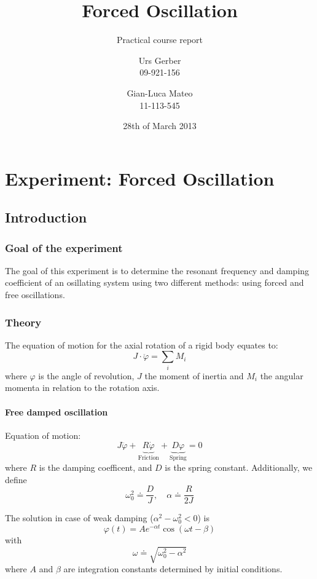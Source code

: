 \documentclass{scrreprt}
\author{Urs Gerber\\09-921-156 \and Gian-Luca Mateo\\11-113-545}
\date{28th of March 2013}
\title{Forced Oscillation}
\subtitle{Practical course report}
\renewcommand{\phi}{\varphi}
\begin{document}
\maketitle

\tableofcontents
\newpage

\chapter{Experiment: Forced Oscillation}
\section{Introduction}
\subsection{Goal of the experiment}
The goal of this experiment is to determine the resonant frequency and damping coefficient of an osillating system using two different methods: using forced and free oscillations.

\subsection{Theory}
The equation of motion for the axial rotation of a rigid body equates to:
\begin{equation}
J\cdot \ddot{\phi} = \sum_i M_i
\end{equation}
where $\phi$ is the angle of revolution, $J$ the moment of inertia and $M_i$ the angular momenta in relation to the rotation axis.

\subsubsection{Free damped oscillation}
Equation of motion:
\begin{equation}
J\ddot{\phi} + \underbrace{R \dot{\phi}}_{\text{Friction}} + \underbrace{D \phi}_{\text{Spring}} = 0
\end{equation}
where $R$ is the damping coefficent, and $D$ is the spring constant. Additionally, we define
\begin{equation}
\omega_0^2 \doteq \frac{D}{J}, \quad \alpha \doteq \frac{R}{2J}
\end{equation}

The solution in case of weak damping ($\alpha^2 - \omega_0^2 < 0$) is
\begin{equation}
\phi(t) = A e^{-\alpha t} \cos{\left(\omega t - \beta\right)} \label{eq:freedampedsolution}
\end{equation}
with
\begin{equation} 
\omega \doteq \sqrt{\omega_0^2-\alpha^2}
\label{omega0}
\end{equation}
where $A$ and $\beta$ are integration constants determined by initial conditions.
\end{document}
